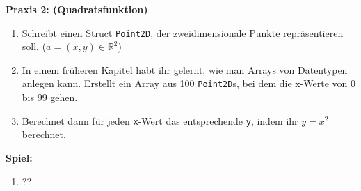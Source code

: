 \textbf{Praxis 2: (Quadratsfunktion)}
\begin{enumerate}
    \item Schreibt einen Struct \texttt{Point2D}, der zweidimensionale Punkte
        repräsentieren soll. ($a = (x, y) \in \mathbb{R}^2$)
    \item In einem früheren Kapitel habt ihr gelernt, wie man Arrays von
        Datentypen anlegen kann. Erstellt ein Array aus 100 \texttt{Point2D}s, bei dem die
        x-Werte von 0 bis 99 gehen.
    \item Berechnet dann für jeden \texttt{x}-Wert das entsprechende \texttt{y},
        indem ihr $y = x^2$ berechnet.
\end{enumerate}

\textbf{Spiel:}
\begin{enumerate}
    \item ??
\end{enumerate}
